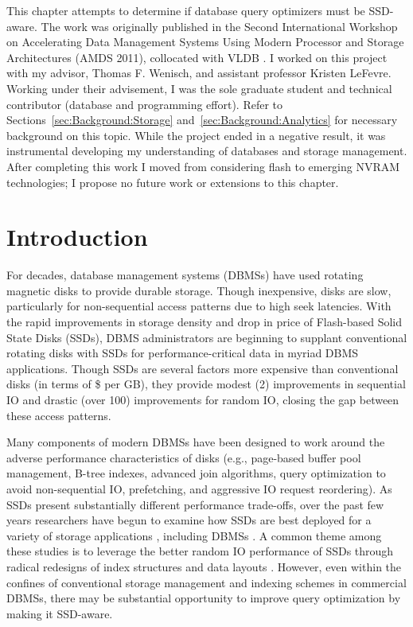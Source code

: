 This chapter attempts to determine if database query optimizers must be SSD-aware.
The work was originally published in the Second International Workshop on Accelerating Data Management Systems Using Modern Processor and Storage Architectures (AMDS 2011), collocated with VLDB \cite{PelleyWenisch11}.
I worked on this project with my advisor, Thomas F. Wenisch, and assistant professor Kristen LeFevre.
Working under their advisement, I was the sole graduate student and technical contributor (database and programming effort).
Refer to Sections~\ref{sec:Background:Storage} and~\ref{sec:Background:Analytics} for necessary background on this topic.
While the project ended in a negative result, it was instrumental developing my understanding of databases and storage management.
After completing this work I moved from considering flash to emerging NVRAM technologies; I propose no future work or extensions to this chapter.

\section{Introduction}
\label{sec:FlashOpti:Intro}

For decades, database management systems (DBMSs) have used rotating magnetic disks to provide durable storage.
Though inexpensive, disks are slow, particularly for non-sequential access patterns due to high seek latencies.
With the rapid improvements in storage density and drop in price of Flash-based Solid State Disks (SSDs), DBMS administrators are beginning to supplant conventional rotating disks with SSDs for performance-critical data in myriad DBMS applications.
Though SSDs are several factors more expensive than conventional disks (in terms of \$ per GB), they provide modest (2\texttimes) improvements in sequential IO and drastic (over 100\texttimes) improvements for random IO, closing the gap between these access patterns.

Many components of modern DBMSs have been designed to work around the adverse performance characteristics of disks (e.g., page-based buffer pool management, B-tree indexes, advanced join algorithms, query optimization to avoid non-sequential IO, prefetching, and aggressive IO request reordering).  
As SSDs present substantially different performance trade-offs, over the past few years researchers have begun to examine how SSDs are best deployed for a variety of storage applications \cite{Bouganim09uflip:understanding, Chen2009}, including DBMSs \cite{Lee2008, Yin2009, Li2009, Baumann2010, Tsirogiannis2009}.  
A common theme among these studies is to leverage the better random IO performance of SSDs through radical redesigns of index structures \cite{Yin2009, Li2009} and data layouts \cite{Baumann2010, Tsirogiannis2009}. 
However, even within the confines of conventional storage management and indexing schemes in commercial DBMSs, there may be substantial opportunity to improve query optimization by making it SSD-aware.


